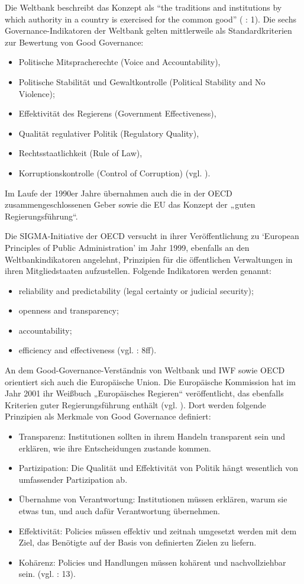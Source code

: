 Die Weltbank beschreibt das Konzept als “the traditions and institutions by which authority in a country is exercised for the common good” (\cite{weltbank} : 1). Die sechs Governance-Indikatoren der Weltbank gelten mittlerweile als Standardkriterien zur Bewertung von Good Governance: 
\begin{itemize}
\item Politische Mitspracherechte (Voice and Accountability),
\item Politische Stabilität und Gewaltkontrolle (Political Stability and No Violence);
\item Effektivität des Regierens (Government Effectiveness),
\item Qualität regulativer Politik (Regulatory Quality),
\item Rechtsstaatlichkeit (Rule of Law),
\item Korruptionskontrolle (Control of Corruption) (vgl. \cite{kaufmann}).
\end{itemize}
Im Laufe der 1990er Jahre übernahmen auch die in der OECD zusammengeschlossenen Geber sowie die EU das Konzept der „guten Regierungsführung“.\par
Die SIGMA-Initiative der OECD versucht in ihrer Veröffentlichung zu ‘European Principles of Public Administration’ im Jahr 1999, ebenfalls an den Weltbankindikatoren angelehnt, Prinzipien für die öffentlichen Verwaltungen in ihren Mitgliedstaaten aufzustellen. Folgende Indikatoren werden genannt: 
\begin{itemize}
\item reliability and predictability (legal certainty or judicial security); 
\item openness and transparency; 
\item accountability; 
\item efficiency and effectiveness (vgl. \cite{oecd99} : 8ff).
\end{itemize}
An dem Good-Governance-Verständnis von Weltbank und IWF sowie OECD orientiert sich auch die Europäische Union. Die Europäische Kommission hat im Jahr 2001 ihr Weißbuch „Europäisches Regieren“ veröffentlicht, das ebenfalls Kriterien guter Regierungsführung enthält (vgl. \cite{czada2010}). Dort werden folgende Prinzipien als Merkmale von Good Governance definiert:
\begin{itemize}
\item Transparenz: Institutionen sollten in ihrem Handeln transparent sein und erklären, wie ihre Entscheidungen zustande kommen.
\item Partizipation: Die Qualität und Effektivität von Politik hängt wesentlich von umfassender Partizipation ab.
\item Übernahme von Verantwortung: Institutionen müssen erklären, warum sie etwas tun, und auch dafür Verantwortung übernehmen.
\item Effektivität: Policies müssen effektiv und zeitnah umgesetzt werden mit dem Ziel, das Benötigte auf der Basis von definierten Zielen zu liefern.
\item Kohärenz: Policies und Handlungen müssen kohärent und nachvollziehbar sein.
(vgl. \cite{euko01} : 13).
\end{itemize}
